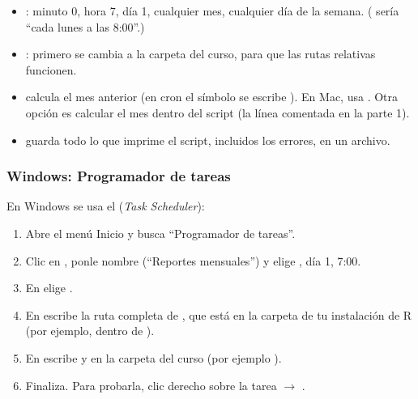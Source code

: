 \begin{itemize}
  \item {}: minuto 0, hora 7, día 1, cualquier mes,
        cualquier día de la semana. ( sería ``cada lunes a
        las 8:00''.)
  \item {}: primero se cambia a la carpeta del curso,
        para que las rutas relativas funcionen.
  \item {} calcula el mes anterior
        (en cron el símbolo \codigo{\%} se escribe \codigo{\textbackslash\%}).
        En Mac, usa . Otra opción es calcular el
        mes dentro del script (la línea comentada en la parte 1).
  \item {} guarda todo lo que imprime el
        script, incluidos los errores, en un archivo.
\end{itemize}

\subsubsection{Windows: Programador de tareas}

En Windows se usa el  (\emph{Task
Scheduler}):

\begin{enumerate}
  \item Abre el menú Inicio y busca ``Programador de tareas''.
  \item Clic en , ponle nombre (``Reportes
        mensuales'') y elige , día 1, 7:00.
  \item En  elige .
  \item En  escribe la ruta completa de
        , que está en la carpeta  de
        tu instalación de R (por ejemplo, dentro de
        ).
  \item En  escribe
         y en
         la carpeta del curso (por ejemplo
        ).
  \item Finaliza. Para probarla, clic derecho sobre la tarea $\rightarrow$
        .
\end{enumerate}

